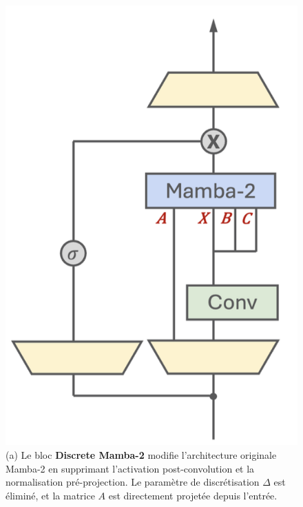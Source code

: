 \begin{figure}[H]
    \centering
    \begin{minipage}{0.45\textwidth}
        \centering
        \includegraphics[width=\linewidth]{images/discrete_mamba2.png}
        \caption*{\justifying \small (a) Le bloc \textbf{Discrete Mamba-2} modifie l'architecture originale Mamba-2 en supprimant l'activation post-convolution et la normalisation pré-projection. Le paramètre de discrétisation $\Delta$ est éliminé, et la matrice $A$ est directement projetée depuis l'entrée.}
    \end{minipage}
    \hfill
    \begin{minipage}{0.45\textwidth}
        \centering

\end{minipage}
\end{figure}

